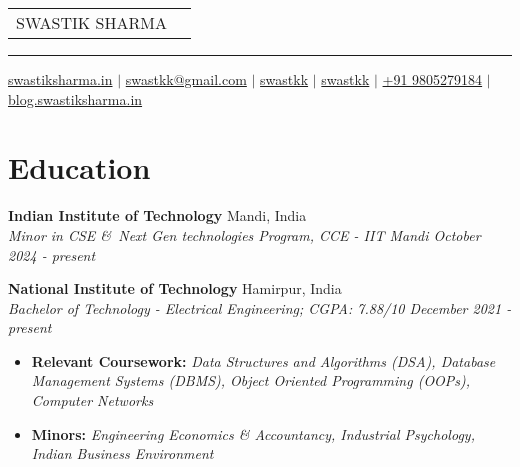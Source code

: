 \documentclass[legalpaper,10.5pt]{article}
\begin{document}
\pagestyle{empty} 

\begin{tabularx}{\linewidth}{@{} l X @{}}
\Huge {SWASTIK SHARMA} & \hfill 
\end{tabularx}
\hrule %

\begin{flushleft}
\href{https://www.swastiksharma.in}{\raisebox{-0.05\height}{\faGlobe} swastiksharma.in} $|$ 
\href{mailto:swastkk@gmail.com}{\raisebox{-0.05\height}{\faEnvelope} swastkk@gmail.com} $|$ 
\href{https://github.com/swastkk}{\raisebox{-0.05\height}{\faGithub} swastkk} $|$ 
\href{https://linkedin.com/in/swastkk}{\raisebox{-0.05\height}{\faLinkedin} swastkk} $|$ 
\href{tel:+919805279184}{\raisebox{-0.05\height}{\faMobile} +91 9805279184} $|$ 
\href{https://blog.swastiksharma.in/}{\raisebox{-0.05\height}{\faPen} blog.swastiksharma.in}
\end{flushleft}


\section{Education}
\textbf{Indian Institute of Technology}  \hfill {Mandi, India}  \\
    \textit{{Minor in CSE \&\ Next Gen technologies Program, CCE - IIT Mandi} \hfill {October 2024 - present}}
    
 \textbf{National Institute of Technology}  \hfill {Hamirpur, India}  \\
    \textit{{Bachelor of Technology - Electrical Engineering; CGPA: 7.88/10} \hfill {December 2021 - present}}
    \begin{itemize}[leftmargin=*,label=$\diamond$]
        \item \small \textbf{Relevant Coursework:} \textit{Data Structures and Algorithms (DSA), Database Management Systems (DBMS), Object Oriented Programming (OOPs),  Computer Networks}
         \item \small \textbf{Minors:} \textit{Engineering Economics \& Accountancy, Industrial Psychology, Indian Business Environment}
    \end{itemize}
\end{document}
